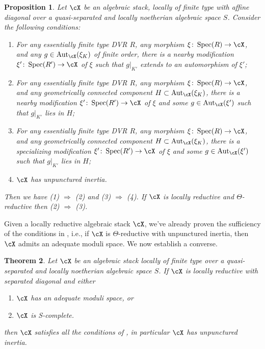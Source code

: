 \documentclass[a4paper]{amsart}
\numberwithin{equation}{section}
\theoremstyle{plain}
\newtheorem{thm}{Theorem}[section]
\newtheorem{prop}[thm]{Proposition}
\theoremstyle{definition}
\DeclareMathOperator{\Spec}{Spec}
\DeclareMathOperator{\Aut}{Aut}
\newcommand{\co}{\colon}
\begin{document}
\begin{prop}\label{prop:crit-unpunctured}
Let $\cX$ be an algebraic stack, locally of finite type with affine diagonal over a quasi-separated and locally noetherian algebraic space $S$.
Consider the following conditions:
\begin{enumerate}
\item For any essentially finite type DVR $R$, any morphism $\xi \co \Spec(R) \to \cX$, and any $g \in \Aut_\cX(\xi_K)$ of finite order, there is a nearby modification $\xi'\co \Spec(R')\to \cX$ of $\xi$ such that $g|_{K'}$ extends to an automorphism of $\xi'$; \label{I:valuative_A}
\item For any essentially finite type DVR $R$, any morphism $\xi \co \Spec(R) \to \cX$, and any geometrically connected component $H \subset \Aut_\cX(\xi_K)$, there is a nearby modification  $\xi'\co \Spec(R')\to \cX$ of $\xi$ and some $g \in \Aut_\cX(\xi')$ such that $g|_{K'}$ lies in $H$; \label{I:valuative_B}
\item For any essentially finite type DVR $R$, any morphism $\xi \co \Spec(R) \to \cX$, and any geometrically connected component $H \subset \Aut_\cX(\xi_K)$, there is a specializing modification  $\xi'\co \Spec(R')\to \cX$ of $\xi$ and some $g \in \Aut_\cX(\xi')$ such that $g|_{K'}$ lies in $H$; \label{I:valuative_C}
\item $\cX$ has unpunctured inertia. \label{I:unpunctured}
\end{enumerate}
Then we have (1) $\Rightarrow$ (2) and (3) $\Rightarrow$ (4). 
If $\cX$ is locally reductive and $\Theta$-reductive then (2) $\Rightarrow$ (3).
\end{prop}

Given a locally reductive algebraic stack $\cX$, we've already proven the sufficiency of the conditions in 
, i.e., if $\cX$ is $\Theta$-reductive with unpunctured inertia, then $\cX$ admits an adequate moduli space.  We now establish a converse.

\begin{thm}\label{T:main_unpunctured}
Let $\cX$ be an algebraic stack locally of finite type over a quasi-separated and locally noetherian algebraic space $S$. If $\cX$ is locally reductive with separated diagonal and either
\begin{enumerate}
	\item \label{T:main_unpunctured1} 
		$\cX$ has an adequate moduli space, or
	\item \label{T:main_unpunctured2} 
		$\cX$ is \textsf{S}-complete.
\end{enumerate}
then $\cX$ satisfies all the conditions of , in particular $\cX$ has unpunctured inertia.
\end{thm}
\end{document}
